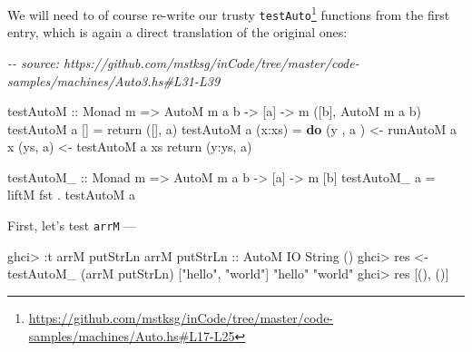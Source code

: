 \documentclass[]{article}
\newenvironment{Shaded}{}{}
\newcommand{\CommentTok}[1]{\textcolor[rgb]{0.38,0.63,0.69}{\textit{#1}}}
\newcommand{\DataTypeTok}[1]{\textcolor[rgb]{0.56,0.13,0.00}{#1}}
\newcommand{\FunctionTok}[1]{\textcolor[rgb]{0.02,0.16,0.49}{#1}}
\newcommand{\KeywordTok}[1]{\textcolor[rgb]{0.00,0.44,0.13}{\textbf{#1}}}
\newcommand{\NormalTok}[1]{#1}
\newcommand{\OperatorTok}[1]{\textcolor[rgb]{0.40,0.40,0.40}{#1}}
\newcommand{\OtherTok}[1]{\textcolor[rgb]{0.00,0.44,0.13}{#1}}
\newcommand{\StringTok}[1]{\textcolor[rgb]{0.25,0.44,0.63}{#1}}
\renewcommand{\href}[2]{#2\footnote{\url{#1}}}
\begin{document}
We will need to of course re-write our trusty
\href{https://github.com/mstksg/inCode/tree/master/code-samples/machines/Auto.hs\#L17-L25}{\texttt{testAuto}}
functions from the first entry, which is again a direct translation of the
original ones:

\begin{Shaded}
\begin{Highlighting}[]
\CommentTok{{-}{-} source: https://github.com/mstksg/inCode/tree/master/code{-}samples/machines/Auto3.hs\#L31{-}L39}

\OtherTok{testAutoM ::} \DataTypeTok{Monad}\NormalTok{ m }\OtherTok{=\textgreater{}} \DataTypeTok{AutoM}\NormalTok{ m a b }\OtherTok{{-}\textgreater{}}\NormalTok{ [a] }\OtherTok{{-}\textgreater{}}\NormalTok{ m ([b], }\DataTypeTok{AutoM}\NormalTok{ m a b)}
\NormalTok{testAutoM a []      }\OtherTok{=} \FunctionTok{return}\NormalTok{ ([], a)}
\NormalTok{testAutoM a (x}\OperatorTok{:}\NormalTok{xs)  }\OtherTok{=} \KeywordTok{do}
\NormalTok{    (y , a\textquotesingle{} ) }\OtherTok{\textless{}{-}}\NormalTok{ runAutoM a x}
\NormalTok{    (ys, a\textquotesingle{}\textquotesingle{}) }\OtherTok{\textless{}{-}}\NormalTok{ testAutoM a\textquotesingle{} xs}
    \FunctionTok{return}\NormalTok{ (y}\OperatorTok{:}\NormalTok{ys, a\textquotesingle{}\textquotesingle{})}

\OtherTok{testAutoM\_ ::} \DataTypeTok{Monad}\NormalTok{ m }\OtherTok{=\textgreater{}} \DataTypeTok{AutoM}\NormalTok{ m a b }\OtherTok{{-}\textgreater{}}\NormalTok{ [a] }\OtherTok{{-}\textgreater{}}\NormalTok{ m [b]}
\NormalTok{testAutoM\_ a }\OtherTok{=}\NormalTok{ liftM }\FunctionTok{fst} \OperatorTok{.}\NormalTok{ testAutoM a}
\end{Highlighting}
\end{Shaded}

First, let's test \texttt{arrM} ---

\begin{Shaded}
\begin{Highlighting}[]
\NormalTok{ghci}\OperatorTok{\textgreater{}} \OperatorTok{:}\NormalTok{t arrM }\FunctionTok{putStrLn}
\NormalTok{arrM}\OtherTok{ putStrLn ::} \DataTypeTok{AutoM} \DataTypeTok{IO} \DataTypeTok{String}\NormalTok{ ()}
\NormalTok{ghci}\OperatorTok{\textgreater{}}\NormalTok{ res }\OtherTok{\textless{}{-}}\NormalTok{ testAutoM\_ (arrM }\FunctionTok{putStrLn}\NormalTok{) [}\StringTok{"hello"}\NormalTok{, }\StringTok{"world"}\NormalTok{]}
\StringTok{"hello"}
\StringTok{"world"}
\NormalTok{ghci}\OperatorTok{\textgreater{}}\NormalTok{ res}
\NormalTok{[(), ()]}
\end{Highlighting}
\end{Shaded}
\end{document}
